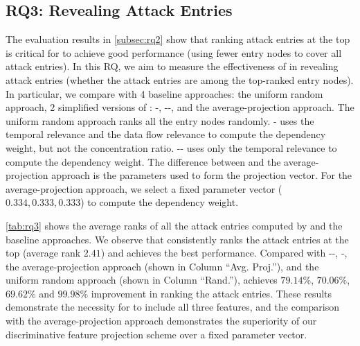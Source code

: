
%




\subsection{RQ3: Revealing Attack Entries}
\label{subsec:rq3}

The evaluation results in \cref{subsec:rq2} show that ranking attack entries at the top is critical for \tool to achieve good performance (\ie using fewer entry nodes to cover all attack entries).
In this RQ, we aim to measure the effectiveness of \tool in revealing attack entries (\ie whether the attack entries are among the top-ranked entry nodes).
In particular, we compare \tool with 4 baseline approaches: the uniform random approach, 2 simplified versions of \tool: \tool-, \tool-{}-, and the average-projection approach.
The uniform random approach ranks all the entry nodes randomly.
\tool- uses the temporal relevance and the data flow relevance to compute the dependency weight, but not the concentration ratio.
\tool-{}- uses only the temporal relevance to compute the dependency weight.
The difference between \tool and the average-projection approach is the parameters used to form the projection vector. 
For the average-projection approach, we select a fixed parameter vector ($0.334, 0.333, 0.333$) to compute the dependency weight. %


\cref{tab:rq3} shows the average ranks of all the attack entries computed by \tool and the baseline approaches.
We observe that \tool consistently ranks the attack entries at the top (average rank $2.41$) and achieves the best performance.
%
Compared with \tool-{}-, \tool-, the average-projection approach (shown in Column ``Avg. Proj.''), and the uniform random approach (shown in Column ``Rand.''), \tool achieves $79.14\%$, $70.06\%$, $69.62\%$ and $99.98\%$ improvement in ranking the attack entries.
These results demonstrate the necessity for \tool to include all three features, 
and the comparison with the average-projection approach demonstrates the superiority of our discriminative feature projection scheme over a fixed parameter vector.



